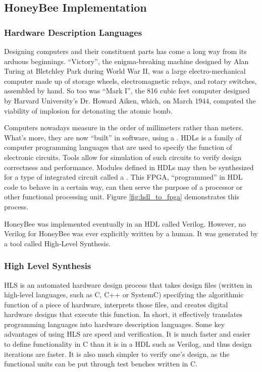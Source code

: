 \subsection{HoneyBee Implementation}
\label{section:honeybee_implementation}
    \subsubsection{Hardware Description Languages}
        Designing computers and their constituent parts has come a long way from its arduous beginnings. ``Victory'', the enigma-breaking machine designed by Alan Turing at Bletchley Park during World War II, was a large electro-mechanical computer made up of storage wheels, electromagnetic relays, and rotary switches, assembled by hand.\cite{ChoiceReviews2006} So too was ``Mark I'', the 816 cubic feet computer designed by Harvard University's Dr. Howard Aiken, which, on March 1944, computed the viability of implosion for detonating the atomic bomb.\cite{Elsabbagh2019}
        
        

        Computers nowadays measure in the order of millimeters rather than meters. What's more, they are now ``built'' in software, using a . \glspl{HDL} is a family of computer programming languages that are used to specify the function of electronic circuits. Tools allow for simulation of such circuits to verify design correctness and performance. Modules defined in \glspl{HDL} may then be synthesized for a type of integrated circuit called a . This \gls{FPGA}, ``programmed'' in \gls{HDL} code to behave in a certain way, can then serve the purpose of a processor or other functional processing unit. Figure \ref{fig:hdl_to_fpga} demonstrates this process.

        

        HoneyBee was implemented eventually in an \gls{HDL} called Verilog. However, no Verilog for HoneyBee was ever explicitly written by a human. It was generated by a tool called High-Level Synthesis.

    \subsubsection{High Level Synthesis}
        \gls{HLS} is an automated hardware design process that takes design files (written in high-level languages, such as C, C++ or SystemC) specifying the algorithmic function of a piece of hardware, interprets those files, and creates digital hardware designs that execute this function. In short, it effectively translates programming languages into hardware description languages. Some key advantages of using HLS are speed and verification. It is much faster and easier to define functionality in C than it is in a \gls{HDL} such as Verilog, and thus design iterations are faster. It is also much simpler to verify one's design, as the functional units can be put through test benches written in C. \\

